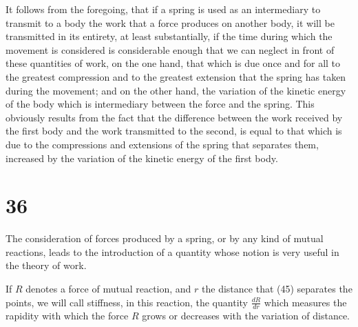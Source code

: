 \documentclass{book}
\begin{document}
It follows from the foregoing, that if a spring is used as an intermediary to transmit to a body the work that a force produces on another body, it will be transmitted in its entirety, at least substantially, if the time during which the movement is considered is considerable enough that we can neglect in front of these quantities of work, on the one hand, that which is due once and for all to the greatest compression and to the greatest extension that the spring has taken during the movement; and on the other hand, the variation of the kinetic energy of the body which is intermediary between the force and the spring. This obviously results from the fact that the difference between the work received by the first body and the work transmitted to the second, is equal to that which is due to the compressions and extensions of the spring that separates them, increased by the variation of the kinetic energy of the first body.

\section{36} The consideration of forces produced by a spring, or by any kind of mutual reactions, leads to the introduction of a quantity whose notion is very useful in the theory of work.

If \( R \) denotes a force of mutual reaction, and \( r \) the distance that
\newpage
(45)
separates the points, we will call stiffness, in this reaction, the quantity \( \frac{dR}{dr} \) which measures the rapidity with which the force \( R \) grows or decreases with the variation of distance.






\backmatter
{}
\printindex
\end{document}
